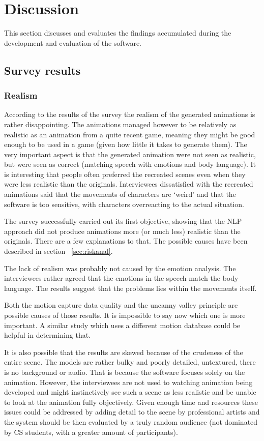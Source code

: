 \chapter{Discussion \label{chap:discussion}}
This section discusses and evaluates the findings accumulated during the development and evaluation of the software.

\section{Survey results}

\subsection{Realism}
According to the results of the survey the realism of the generated animations is rather disappointing. The animations managed however to be relatively as realistic as an animation from a quite recent game, meaning they might be good enough to be used in a game (given how little it takes to generate them). The very important aspect is that the generated animation were not seen as realistic, but were seen as correct (matching speech with emotions and body language). It is interesting that people often preferred the recreated scenes even when they were less realistic than the originals. Interviewees dissatisfied with the recreated animations said that the movements of characters are `weird' and that the software is too sensitive, with characters overreacting to the actual situation. 

The survey successfully carried out its first objective, showing that the NLP approach did not produce animations more (or much less) realistic than the originals. There are a few explanations to that. The possible causes have been described in section ~\ref{sec:riskanal}.

The lack of realism was probably not caused by the emotion analysis. The interviewees rather agreed that the emotions in the speech match the body language. The results suggest that the problems lies within the movements itself. 

Both the motion capture data quality and the uncanny valley principle are possible causes of those results. It is impossible to say now which one is more important. A similar study which uses a different motion database could be helpful in determining that.

It is also possible that the results are skewed because of the crudeness of the entire scene. The models are rather bulky and poorly detailed, untextured, there is no background or audio. That is because the software focuses solely on the animation. However, the interviewees are not used to watching animation being developed and might instinctively see such a scene as less realistic and be unable to look at the animation fully objectively. Given enough time and resources these issues could be addressed by adding detail to the scene by professional artists and the system should be then evaluated by a truly random audience (not dominated by CS students, with a greater amount of participants).

